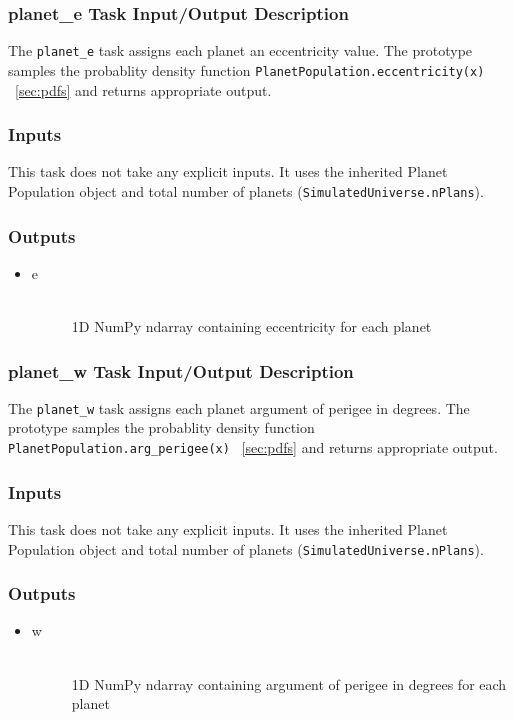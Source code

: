 \documentclass[cleanfoot]{asme2ej}
\begin{document}
\subsubsection{planet\_e Task Input/Output Description} \label{sec:planetetask}
The \verb+planet_e+ task assigns each planet an eccentricity value. The prototype samples the probablity density function \verb+PlanetPopulation.eccentricity(x)+ ~\ref{sec:pdfs} and returns appropriate output.

\subsubsection*{Inputs}
This task does not take any explicit inputs.  It uses the inherited Planet Population object and total number of planets (\verb+SimulatedUniverse.nPlans+).

\subsubsection*{Outputs}
\begin{itemize}
    \item 
    \begin{description}
        \item[e] \hfill \\
        1D NumPy ndarray containing eccentricity for each planet
    \end{description}
\end{itemize}

\subsubsection{planet\_w Task Input/Output Description} \label{sec:planetwtask}
The \verb+planet_w+ task assigns each planet argument of perigee in degrees. The prototype samples the probablity density function \verb+PlanetPopulation.arg_perigee(x)+ ~\ref{sec:pdfs} and returns appropriate output.

\subsubsection*{Inputs}
This task does not take any explicit inputs.  It uses the inherited Planet Population object and total number of planets (\verb+SimulatedUniverse.nPlans+).

\subsubsection*{Outputs}
\begin{itemize}
    \item 
    \begin{description}
        \item[w] \hfill \\
        1D NumPy ndarray containing argument of perigee in degrees for each planet
    \end{description}
\end{itemize}
\end{document}

